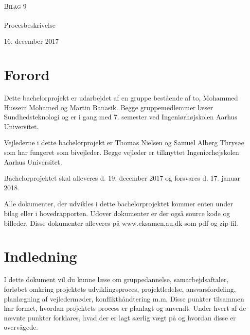 


\begin{titlingpage}
\begin{center}

~ \\[3cm]


\textsc{\LARGE Bilag 9}\\[1.5cm]


\noindent\makebox[\linewidth]{\rule{\textwidth}{0.4pt}}\\
[0.5cm]{\Huge Procesbeskrivelse}
\noindent\makebox[\linewidth]{\rule{\textwidth}{0.4pt}}
\end{center}
\vfill
\begin{center}
{\large 16. december 2017}
\end{center}
\end{titlingpage}

\newpage
\tableofcontents

\chapter{Forord} 

Dette bachelorprojekt er udarbejdet af en gruppe bestående af to, Mohammed Hussein Mohamed og Martin Banasik. Begge gruppemedlemmer læser Sundhedsteknologi og er i gang med 7. semester ved Ingeniørhøjskolen Aarhus Universitet.

Vejlederne i dette bachelorprojekt er Thomas Nielsen og Samuel Alberg Thrysøe som har fungeret som bivejleder. Begge vejleder er tilknyttet Ingeniørhøjskolen Aarhus Universitet.

Bachelorprojektet skal afleveres d. 19. december 2017 og forsvares d. 17. januar 2018.

Alle dokumenter, der udvikles i dette  bachelorprojektet kommer enten under bilag eller i hovedrapporten. Udover dokumenter er der også source kode og billeder. Disse dokumenter afleveres på  www.eksamen.au.dk som pdf og zip-fil. 



\chapter{Indledning}
I dette dokument vil du kunne læse om gruppedannelse, samarbejdsaftaler, forløbet omkring projektets udviklingsproces, projektledelse, ansvarsfordeling, planlægning af vejledermøder, konflikthåndtering m.m. Disse punkter tilsammen har formet, hvordan projektets process er planlagt og anvendt. Under hvert af de nævnte punkter forklares, hvad der er lagt særlig vægt på og hvordan  disse er overvågede. 



